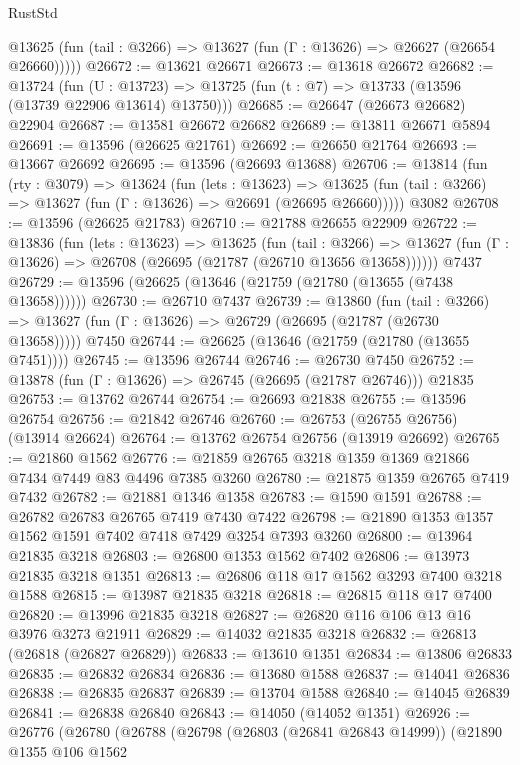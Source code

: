 \begin{lexlean}{RustStd}
\begin{coremodule}
      @13625 (fun (tail : @3266) => @13627 (fun (Γ : @13626) => @26627 (@26654 @26660)))))
@26672 := @13621 @26671
@26673 := @13618 @26672
@26682 := @13724
    (fun (U : @13723) => @13725 (fun (t : @7) => @13733 (@13596 (@13739 @22906 @13614) @13750)))
@26685 := @26647 (@26673 @26682) @22904
@26687 := @13581 @26672 @26682
@26689 := @13811 @26671 @5894
@26691 := @13596 (@26625 @21761)
@26692 := @26650 @21764
@26693 := @13667 @26692
@26695 := @13596 (@26693 @13688)
@26706 := @13814
    (fun (rty : @3079) =>
    @13624
      (fun (lets : @13623) =>
      @13625 (fun (tail : @3266) => @13627 (fun (Γ : @13626) => @26691 (@26695 @26660)))))
    @3082
@26708 := @13596 (@26625 @21783)
@26710 := @21788 @26655 @22909
@26722 := @13836
    (fun (lets : @13623) =>
    @13625
      (fun (tail : @3266) =>
      @13627 (fun (Γ : @13626) => @26708 (@26695 (@21787 (@26710 @13656 @13658))))))
    @7437
@26729 := @13596 (@26625 (@13646 (@21759 (@21780 (@13655 (@7438 @13658))))))
@26730 := @26710 @7437
@26739 := @13860
    (fun (tail : @3266) => @13627 (fun (Γ : @13626) => @26729 (@26695 (@21787 (@26730 @13658)))))
    @7450
@26744 := @26625 (@13646 (@21759 (@21780 (@13655 @7451))))
@26745 := @13596 @26744
@26746 := @26730 @7450
@26752 := @13878 (fun (Γ : @13626) => @26745 (@26695 (@21787 @26746))) @21835
@26753 := @13762 @26744
@26754 := @26693 @21838
@26755 := @13596 @26754
@26756 := @21842 @26746
@26760 := @26753 (@26755 @26756) (@13914 @26624)
@26764 := @13762 @26754 @26756 (@13919 @26692)
@26765 := @21860 @1562
@26776 := @21859 @26765 @3218 @1359 @1369 @21866 @7434 @7449 @83 @4496 @7385 @3260
@26780 := @21875 @1359 @26765 @7419 @7432
@26782 := @21881 @1346 @1358
@26783 := @1590 @1591
@26788 := @26782 @26783 @26765 @7419 @7430 @7422
@26798 := @21890 @1353 @1357 @1562 @1591 @7402 @7418 @7429 @3254 @7393 @3260
@26800 := @13964 @21835 @3218
@26803 := @26800 @1353 @1562 @7402
@26806 := @13973 @21835 @3218 @1351
@26813 := @26806 @118 @17 @1562 @3293 @7400 @3218 @1588
@26815 := @13987 @21835 @3218
@26818 := @26815 @118 @17 @7400
@26820 := @13996 @21835 @3218
@26827 := @26820 @116 @106 @13 @16 @3976 @3273 @21911
@26829 := @14032 @21835 @3218
@26832 := @26813 (@26818 (@26827 @26829))
@26833 := @13610 @1351
@26834 := @13806 @26833
@26835 := @26832 @26834
@26836 := @13680 @1588
@26837 := @14041 @26836
@26838 := @26835 @26837
@26839 := @13704 @1588
@26840 := @14045 @26839
@26841 := @26838 @26840
@26843 := @14050 (@14052 @1351)
@26926 := @26776
    (@26780
      (@26788
        (@26798
          (@26803 (@26841 @26843 @14999))
          (@21890
            @1355
            @106
            @1562

\end{coremodule}
\end{lexlean}
